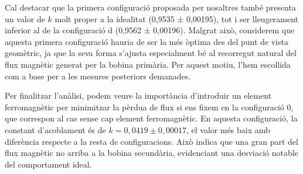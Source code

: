 \documentclass[a4paper,10.5pt]{report}
\begin{document}
Cal destacar que la primera configuració proposada per nosaltres també presenta un valor de $k$ molt proper a la idealitat (0,9535 ± 0,00195), tot i ser lleugerament inferior al de la configuració d (0,9562 ± 0,00196). Malgrat això, considerem que aquesta primera configuració hauria de ser la més òptima des del punt de vista geomètric, ja que la seva forma s’ajusta especialment bé al recorregut natural del flux magnètic generat per la bobina primària. Per aquest motiu, l’hem escollida com a base per a les mesures posteriors demanades.

Per finalitzar l'anàlisi, podem veure la importància d’introduir un element ferromagnètic per minimitzar la pèrdua de flux si ens fixem en la configuració 0, que correspon al cas sense cap element ferromagnètic. En aquesta configuració, la constant d’acoblament és de $k = 0,0419 ± 0,00017 $, el valor més baix amb diferència respecte a la resta de configuracions. Això indica que una gran part del flux magnètic no arriba a la bobina secundària, evidenciant una desviació notable del comportament ideal.
\end{document}
